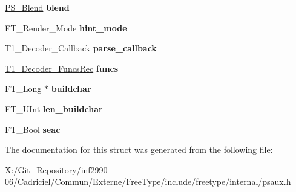 \begin{DoxyCompactItemize}
\item 
\hypertarget{struct_t1___decoder_rec___a0cd698c7041cb4f319949b62f215f7c7}{\hyperlink{struct_p_s___blend_rec__}{P\-S\-\_\-\-Blend} {\bfseries blend}}\label{struct_t1___decoder_rec___a0cd698c7041cb4f319949b62f215f7c7}

\item 
\hypertarget{struct_t1___decoder_rec___a364b15149edb573dcc79be015eba61b4}{F\-T\-\_\-\-Render\-\_\-\-Mode {\bfseries hint\-\_\-mode}}\label{struct_t1___decoder_rec___a364b15149edb573dcc79be015eba61b4}

\item 
\hypertarget{struct_t1___decoder_rec___a840af0b01e7adb1e3aa521a936196b62}{T1\-\_\-\-Decoder\-\_\-\-Callback {\bfseries parse\-\_\-callback}}\label{struct_t1___decoder_rec___a840af0b01e7adb1e3aa521a936196b62}

\item 
\hypertarget{struct_t1___decoder_rec___a6b0f5f7cb3f44e88880aa9c927d79775}{\hyperlink{struct_t1___decoder___funcs_rec__}{T1\-\_\-\-Decoder\-\_\-\-Funcs\-Rec} {\bfseries funcs}}\label{struct_t1___decoder_rec___a6b0f5f7cb3f44e88880aa9c927d79775}

\item 
\hypertarget{struct_t1___decoder_rec___a967ee06cbbdc8823be8f95df5db625b9}{F\-T\-\_\-\-Long $\ast$ {\bfseries buildchar}}\label{struct_t1___decoder_rec___a967ee06cbbdc8823be8f95df5db625b9}

\item 
\hypertarget{struct_t1___decoder_rec___a55fd1c88d6f7badaec2aa13db17c816f}{F\-T\-\_\-\-U\-Int {\bfseries len\-\_\-buildchar}}\label{struct_t1___decoder_rec___a55fd1c88d6f7badaec2aa13db17c816f}

\item 
\hypertarget{struct_t1___decoder_rec___a45bf18b54ff973177ea3061ef0b705c6}{F\-T\-\_\-\-Bool {\bfseries seac}}\label{struct_t1___decoder_rec___a45bf18b54ff973177ea3061ef0b705c6}

\end{DoxyCompactItemize}


The documentation for this struct was generated from the following file\-:\begin{DoxyCompactItemize}
\item 
X\-:/\-Git\-\_\-\-Repository/inf2990-\/06/\-Cadriciel/\-Commun/\-Externe/\-Free\-Type/include/freetype/internal/psaux.\-h\end{DoxyCompactItemize}
